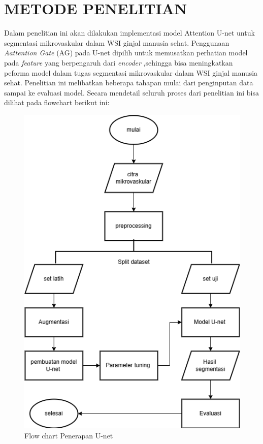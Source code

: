 \chapter{METODE PENELITIAN}

\noindent Dalam penelitian ini akan dilakukan implementasi model Attention U-net untuk segmentasi mikrovaskular dalam WSI ginjal manusia sehat.  Penggunaan \textit{Aattention Gate} (AG) pada U-net dipilih untuk memusatkan perhatian model pada \textit{feature} yang berpengaruh dari \textit{encoder} ,sehingga bisa meningkatkan peforma model dalam tugas segmentasi mikrovaskular dalam WSI ginjal manusia sehat. Penelitian ini melibatkan beberapa tahapan mulai dari penginputan data sampai ke evaluasi model. Secara mendetail seluruh proses dari penelitian ini bisa dilihat pada flowchart berikut ini:
\begin{figure}[H]
	\centering
	\includegraphics[scale=.6]{gambar/flow-chart.png}
	\caption{Flow chart Penerapan U-net}
	\label{fig:flow-chart}
\end{figure}

